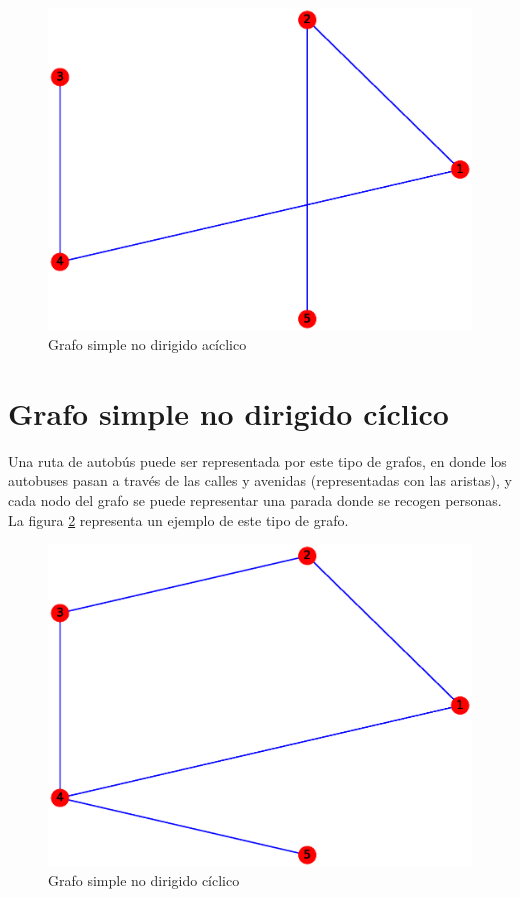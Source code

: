 \documentclass{article}
\begin{document}
\begin{figure}[h!]
    \includegraphics[width=\textwidth]{1-GSNDA}
    \caption{Grafo simple no dirigido acíclico}
    \label{fig:GSNDA}
\end{figure}





\section{Grafo simple no dirigido cíclico}
Una ruta de autobús puede ser representada por este tipo de grafos, en donde los autobuses pasan a través de las calles y avenidas (representadas con las aristas), y cada nodo del grafo se puede representar una parada donde se recogen personas. La figura \ref{fig:GSNDC} representa un ejemplo de este tipo de grafo.
\begin{figure}[h!]
    \includegraphics[width=\textwidth]{2-GSNDC}
    \caption{Grafo simple no dirigido cíclico}
    \label{fig:GSNDC}
\end{figure}
\end{document}

